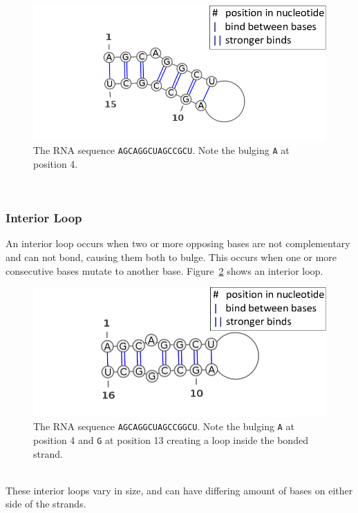 \begin{figure}[H]
\centering
\includegraphics[scale=0.4]{./lib/bulge.png}
\caption{The RNA sequence {\tt AGCAGGCUAGCCGCU}. Note the bulging {\tt A} at position 4.}
\label{fig:bulge}
\end{figure}~
\\
\subsubsection{Interior Loop}
An interior loop occurs when two or more opposing bases are not complementary and 
can not bond, causing them both to bulge. This occurs when one or more 
consecutive bases mutate to another base. Figure~\ref{fig:int-loop} shows an interior 
loop.
\begin{figure}[h!]
\centering
\includegraphics[scale=0.4]{./lib/interior-loop.png}
\caption{The RNA sequence {\tt AGCAGGCUAGCCGGCU}. Note the bulging {\tt A} at position 4 and {\tt G} at position 13
creating a loop inside the bonded strand.}
\label{fig:int-loop}
\end{figure}\\
These interior loops vary in size, and can have differing amount of bases on 
either side of the strands.
